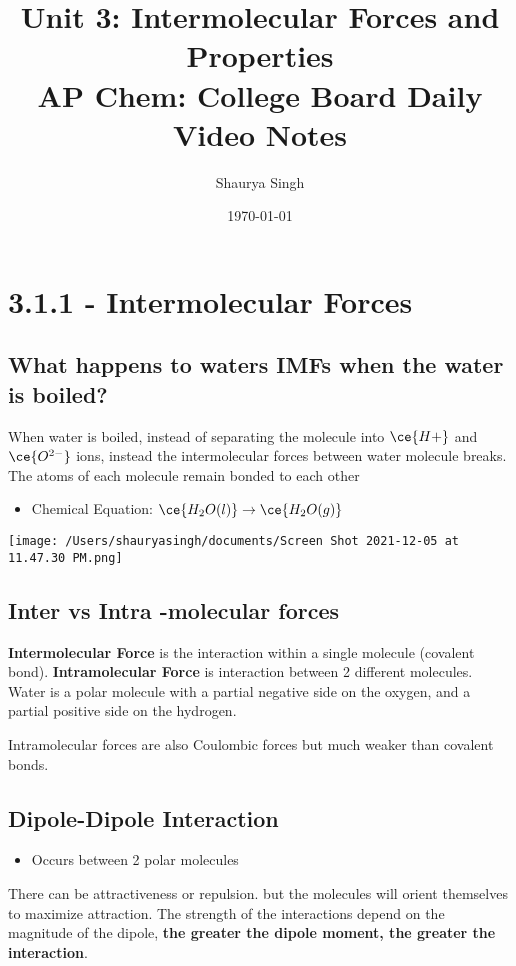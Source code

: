 \documentclass{scrartcl}
\author{Shaurya Singh}
\date{\today}
\title{Unit 3: Intermolecular Forces and Properties\\\medskip
\large AP Chem: College Board Daily Video Notes}
\begin{document}
\makeatletter
\newcommand{\citeprocitem}[2]{\hyper@linkstart{cite}{citeproc_bib_item_#1}#2\hyper@linkend}
\makeatother



\maketitle
\tableofcontents


\section{3.1.1 - Intermolecular Forces}
\label{sec:org974cdcb}
\subsection{What happens to waters IMFs when the water is boiled?}
\label{sec:org2d6c8a6}
When water is boiled, instead of separating the molecule into \(\ce{H+}\) and \(\ce{O^{2-}}\) ions, instead the intermolecular forces between water molecule breaks. The atoms of each molecule remain bonded to each other
\begin{itemize}
\item Chemical Equation: \(\ce{H_2O(l)}\rightarrow\ce{H_2O(g)}\)
\end{itemize}
\begin{center}
\texttt{[image: /Users/shauryasingh/documents/Screen Shot 2021-12-05 at 11.47.30 PM.png]}
\end{center}
\subsection{Inter vs Intra -molecular forces}
\label{sec:org36f3c82}
\textbf{Intermolecular Force} is the interaction within a single molecule (covalent bond). \textbf{Intramolecular Force} is interaction between 2 different molecules. Water is a polar molecule with a partial negative side on the oxygen, and a partial positive side on the hydrogen.

Intramolecular forces are also Coulombic forces but much weaker than covalent bonds.
\subsection{Dipole-Dipole Interaction}
\label{sec:org779e455}
\begin{itemize}
\item Occurs between 2 polar molecules
\end{itemize}
There can be attractiveness or repulsion. but the molecules will orient themselves to maximize attraction. The strength of the interactions depend on the magnitude of the dipole, \textbf{the greater the dipole moment, the greater the interaction}.
\end{document}
